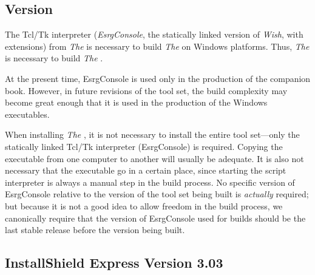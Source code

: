 \subsection{\tsname{} Version \tsversion{}}
\label{crsi0:swso0:sets0}


The Tcl/Tk interpreter 
(\emph{EsrgConsole}, 
the statically linked version
of \emph{Wish}, with extensions)
from \emph{The \tsname{}} is necessary to build
\emph{The \tsname{}} on Windows platforms.  Thus, \emph{The \tsname{}}
is necessary to build \emph{The \tsname{}}.  

At the present time, EsrgConsole is used only in the production
of the companion book.  However, in future revisions of
the tool set, the build complexity may become great enough that
it is used in the production of the Windows executables.

When installing \emph{The \tsname{}}, it is not necessary to
install the entire tool set---only the statically linked
Tcl/Tk interpreter (EsrgConsole) is required.  Copying the executable
from one computer to another will usually be adequate.  It is also not
necessary that the executable go in a certain place, since starting
the script interpreter is always a manual step in the build process.
No specific version of EsrgConsole relative to the version of the
tool set being built is \emph{actually} required; but
because it is not a good idea to allow freedom in the build process,
we canonically require that the version of EsrgConsole used for builds
should be the last stable release before the version being built.


\subsection{InstallShield Express Version 3.03}
\label{crsi0:swso0:sise0}

